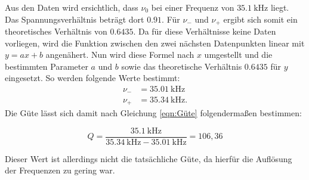 Aus den Daten wird ersichtlich, dass $\nu_0$ bei einer Frequenz von $\SI{35.1}{\kilo\hertz}$ liegt.
Das Spannungsverhältnis beträgt dort $0.91$.
Für $\nu_-$ und $\nu_+$ ergibt sich somit ein theoretisches Verhältnis von $\num{0.6435}$.
Da für diese Verhältnisse keine Daten vorliegen, wird die Funktion zwischen den zwei nächsten Datenpunkten linear mit $y=ax+b$ angenähert.
Nun wird diese Formel nach $x$ umgestellt und die bestimmten Parameter $a$ und $b$ sowie das theoretische Verhältnis $\num{0.6435}$ für $y$ eingesetzt.
So werden folgende Werte bestimmt:
\begin{align*}
  \nu_- &= \SI{35.01}{\kilo\hertz} \\
  \nu_+ &= \SI{35.34}{\kilo\hertz} .
\end{align*}
Die Güte lässt sich damit nach Gleichung \eqref{eqn:Güte} folgendermaßen bestimmen:

\begin{equation*}
  Q = \frac{\SI{35.1}{\kilo\hertz}}{\SI{35.34}{\kilo\hertz} - \SI{35.01}{\kilo\hertz}} = 106,36
\end{equation*}

Dieser Wert ist allerdings nicht die tatsächliche Güte, da hierfür die Auflösung der Frequenzen zu gering war.

